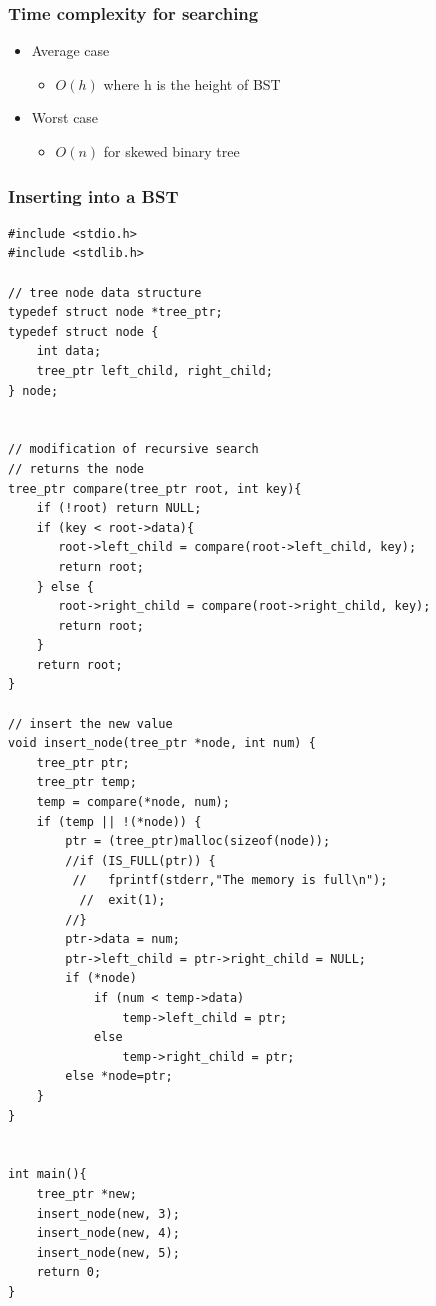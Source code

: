 \documentclass[newPxFont,sthlmFooter,nooffset]{beamer}
\begin{document}
\begin{frame}[t]
  \frametitle{Time complexity for searching}
  \begin{itemize}
  \item Average case
    \begin{itemize}
    \item $O(h)$ where h is the height of BST
    \end{itemize}
  \item Worst case
    \begin{itemize}
    \item $O(n)$ for skewed binary tree
    \end{itemize}
  \end{itemize}
\end{frame}


\begin{frame}
  \frametitle{Inserting into a BST}
  \begin{lstlisting}
#include <stdio.h>
#include <stdlib.h>

// tree node data structure
typedef struct node *tree_ptr;
typedef struct node {
	int data;
	tree_ptr left_child, right_child;
} node;


// modification of recursive search
// returns the node 
tree_ptr compare(tree_ptr root, int key){
    if (!root) return NULL;
    if (key < root->data){
       root->left_child = compare(root->left_child, key);
       return root;
    } else {
       root->right_child = compare(root->right_child, key);
       return root;
    }
    return root;
}

// insert the new value
void insert_node(tree_ptr *node, int num) { 
    tree_ptr ptr;
    tree_ptr temp;
    temp = compare(*node, num); 
    if (temp || !(*node)) {
        ptr = (tree_ptr)malloc(sizeof(node)); 
        //if (IS_FULL(ptr)) {
         //   fprintf(stderr,"The memory is full\n"); 
          //  exit(1);
        //}
        ptr->data = num;
        ptr->left_child = ptr->right_child = NULL; 
        if (*node)
            if (num < temp->data) 
                temp->left_child = ptr;
            else
                temp->right_child = ptr;
        else *node=ptr; 
    }
}


int main(){
	tree_ptr *new;
	insert_node(new, 3);
	insert_node(new, 4);
	insert_node(new, 5);
	return 0;
}
 \end{lstlisting}
\end{frame}
\end{document}
